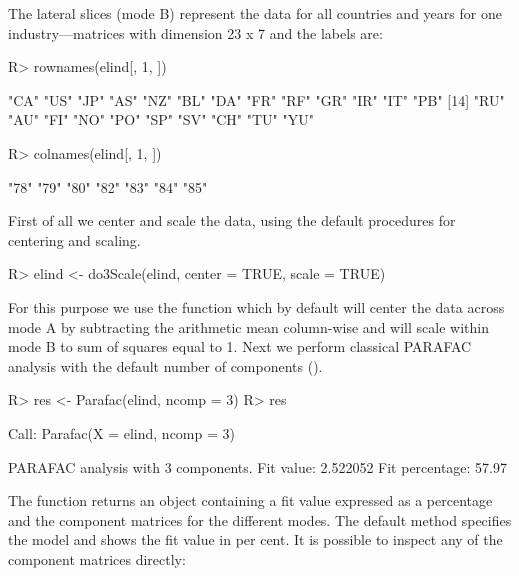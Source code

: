 \documentclass[article,shortnames, nojss]{jss}
\begin{document}
The lateral slices (mode B) represent the data for all countries and years for one industry---matrices
with dimension 23 x 7 and the labels are:
\begin{Schunk}
\begin{Sinput}
R> rownames(elind[, 1, ])
\end{Sinput}
\begin{Soutput}
 [1] "CA" "US" "JP" "AS" "NZ" "BL" "DA" "FR" "RF" "GR" "IR" "IT" "PB"
[14] "RU" "AU" "FI" "NO" "PO" "SP" "SV" "CH" "TU" "YU"
\end{Soutput}
\begin{Sinput}
R> colnames(elind[, 1, ])
\end{Sinput}
\begin{Soutput}
[1] "78" "79" "80" "82" "83" "84" "85"
\end{Soutput}
\end{Schunk}
First of all we center and scale the data, using the default procedures for centering and scaling.
\begin{Schunk}
\begin{Sinput}
R> elind <- do3Scale(elind, center = TRUE, scale = TRUE)
\end{Sinput}
\end{Schunk}
For this purpose we use the function  which by default will center the data across mode A
by subtracting the arithmetic mean column-wise and will scale within mode B to sum of squares equal to 1.
Next we perform classical PARAFAC analysis with the default number of components ().
\begin{Schunk}
\begin{Sinput}
R> res <- Parafac(elind, ncomp = 3)
R> res
\end{Sinput}
\begin{Soutput}
Call:
Parafac(X = elind, ncomp = 3)


PARAFAC analysis with  3  components.
Fit value: 2.522052 
Fit percentage: 57.97 %
\end{Soutput}
\end{Schunk}
The function returns an  object containing a fit value expressed
as a percentage and the component matrices for the different modes. The
default  method specifies the model and shows the fit value
in per cent. It is possible to inspect any of the component matrices directly:
\end{document}
